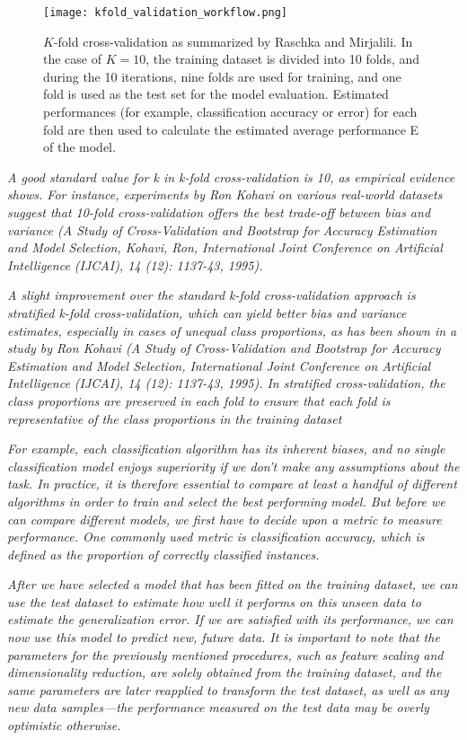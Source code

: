 \begin{figure}[hbt!]
    \centering
    \texttt{[image: kfold\_validation\_workflow.png]}
    \caption{$K$-fold cross-validation as summarized by Raschka and Mirjalili\cite{RaschkaMirjalili2017}.
    In the case of $K=10$, the training dataset is divided into 10 folds, and during the 10 iterations, nine folds are used for training, and one fold is used as the test set for the model evaluation.
    Estimated performances (for example, classification accuracy or error) for each fold are then used to calculate the estimated average performance E of the model.}
    \label{fig:kfold_validation_workflow}
\end{figure}

\textit{A good standard value for k in k-fold cross-validation is 10, as empirical evidence shows. For instance, experiments by Ron Kohavi on various real-world datasets suggest that 10-fold cross-validation offers the best trade-off between bias and variance (A Study of Cross-Validation and Bootstrap for Accuracy Estimation and Model Selection, Kohavi, Ron, International Joint Conference on Artificial Intelligence (IJCAI), 14 (12): 1137-43, 1995).}\cite{Kohavi1995}

\textit{A slight improvement over the standard k-fold cross-validation approach is stratified k-fold cross-validation, which can yield better bias and variance estimates, especially in cases of unequal class proportions, as has been shown in a study by Ron Kohavi (A Study of Cross-Validation and Bootstrap for Accuracy Estimation and Model Selection, International Joint Conference on Artificial Intelligence (IJCAI), 14 (12): 1137-43, 1995). In stratified cross-validation, the class proportions are preserved in each fold to ensure that each fold is representative of the class proportions in the training dataset}\cite{Kohavi1995}

\textit{For example, each classification algorithm has its inherent biases, and no single classification model enjoys superiority if we don't make any assumptions about the task. In practice, it is therefore essential to compare at least a handful of different algorithms in order to train and select the best performing model. But before we can compare different models, we first have to decide upon a metric to measure performance. One commonly used metric is classification accuracy, which is defined as the proportion of correctly classified instances.}

\textit{After we have selected a model that has been fitted on the training dataset, we can use the test dataset to estimate how well it performs on this unseen data to estimate the generalization error. If we are satisfied with its performance, we can now use this model to predict new, future data. It is important to note that the parameters for the previously mentioned procedures, such as feature scaling and dimensionality reduction, are solely obtained from the training dataset, and the same parameters are later reapplied to transform the test dataset, as well as any new data samples—the performance measured on the test data may be overly optimistic otherwise.}

